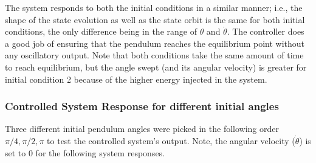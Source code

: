 \documentclass[10pt]{article}
\begin{document}
The system responds to both the initial conditions in a similar manner; i.e., the shape of the state evolution as well as the state orbit is the same for both initial conditions, the only difference being in the range of $\theta$ and $\dot{\theta}$. The controller does a good job of ensuring that the pendulum reaches the equilibrium point without any oscillatory output. Note that both conditions take the same amount of time to reach equilibrium, but the angle swept (and its angular velocity) is greater for initial condition 2 because of the higher energy injected in the system. 

\subsubsection{Controlled System Response for different initial angles}
Three different initial pendulum angles were picked in the following order $\pi/4, \pi/2, \pi$ to test the controlled system's output. Note, the angular velocity ($\dot{\theta}$) is set to 0 for the following system responses.
\end{document}
